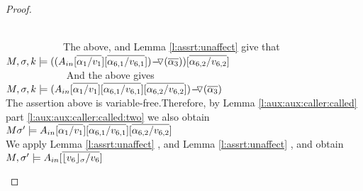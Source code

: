 \begin{proof}
\begin{enumerate}[a.]
 \\
$\strut \hspace{2cm}  $The above, and   Lemma \ref{l:assrt:unaffect}     give that\\
 $\satDAssertFrom M  \sigma k  {({ \PushASLong  {(\overline {\alpha_3})}  {( \Ain[\overline  {\alpha_1 /v_1} ] [\overline { \alpha_{6,1}/v_{6,1}}] )}}
 ) [\overline  {\alpha_{6,2} /v_{6,2}} ] }$
  \\
$\strut \hspace{2cm}  $ And the above gives\\
 $\satDAssertFrom M  \sigma k  { \PushASLong  {(\overline {\alpha_3})}  {( \Ain[\overline  {\alpha_1 /v_1} ] [\overline { \alpha_{6,1}/v_{6,1}}]  [\overline  {\alpha_{6,2} /v_{6,2}} ] ) }} $
  \\
The assertion above is variable-free.Therefore,  by Lemma \ref{l:aux:aux:caller:called} part \ref{l:aux:aux:caller:called:two} we also obtain\\ 
$ M  \sigma' \models  {   {  \Ain[\overline  {\alpha_1 /v_1} ] [\overline { \alpha_{6,1}/v_{6,1}}]  [\overline  {\alpha_{6,2} /v_{6,2}} ] }} $  
  \\
We apply Lemma  \ref{l:assrt:unaffect}   , and  Lemma \ref{l:assrt:unaffect}   , and obtain \\
$ M,   {\sigma'}  \models  { \Ain   [\overline {  \interpret {\sigma} {v_6}/v_6 }]}$  
  
  
\end{enumerate}


\end{proof}

